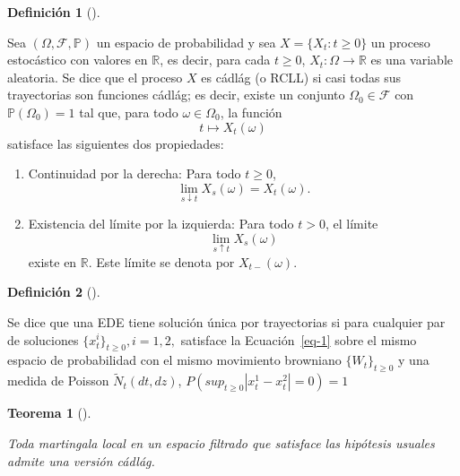 \documentclass[
  spanish,
  us-letterpaper,
]{scrreprt}
\theoremstyle{plain}
\newtheorem{theorem}{Teorema}[chapter]
\theoremstyle{plain}
\theoremstyle{definition}
\newtheorem{definition}{Definición}[chapter]
\theoremstyle{remark}
\begin{document}
\begin{definition}[]\protect\hypertarget{def-Proceso_cadlag}{}\label{def-Proceso_cadlag}

Sea \((\Omega, \mathcal{F}, \mathbb{P})\) un espacio de probabilidad y
sea \(X = \{X_t : t \geq 0\}\) un proceso estocástico con valores en
\(\mathbb{R}\), es decir, para cada \(t \geq 0\),
\(X_t : \Omega \to \mathbb{R}\) es una variable aleatoria. Se dice que
el proceso \(X\) es cádlág (o RCLL) si casi todas sus trayectorias son
funciones cádlág; es decir, existe un conjunto
\(\Omega_0 \in \mathcal{F}\) con \(\mathbb{P}(\Omega_0) = 1\) tal que,
para todo \(\omega \in \Omega_0\), la función\\
\[t \mapsto X_t(\omega)\] satisface las siguientes dos propiedades:

\begin{enumerate}
\def\labelenumi{\arabic{enumi}.}
\item
  Continuidad por la derecha: Para todo \(t \geq 0\),
  \[\lim_{s \downarrow t} X_s(\omega) = X_t(\omega).\]
\item
  Existencia del límite por la izquierda: Para todo \(t > 0\), el
  límite\\
  \[\lim_{s \uparrow t} X_s(\omega)\] existe en \(\mathbb{R}\). Este
  límite se denota por \(X_{t-}(\omega)\).
\end{enumerate}

\end{definition}

\begin{definition}[]\protect\hypertarget{def-Unicidad_trayectorias}{}\label{def-Unicidad_trayectorias}

Se dice que una EDE tiene solución única por trayectorias si para
cualquier par de soluciones \(\{x_t^i\}_{t\geq0}, i = 1,2,\) satisface
la Ecuación~\ref{eq-1} sobre el mismo espacio de probabilidad con el
mismo movimiento browniano \(\{W_t\}_{t\geq0}\) y una medida de Poisson
\(\widetilde{N}_t(dt,dz)\), \(P(sup_{t\geq0} |x_t^1 - x_t^2|=0) =1\)

\end{definition}

\begin{theorem}[]\protect\hypertarget{thm-Modificacion_cadlag}{}\label{thm-Modificacion_cadlag}

Toda martingala local en un espacio filtrado que satisface las hipótesis
usuales admite una versión cádlág.

\end{theorem}
\end{document}
